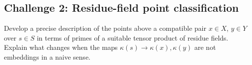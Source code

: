 \subsection*{Challenge 2: Residue-field point classification}
\begin{problem}\label{chal:vi23-02}
Develop a precise description of the points above a compatible pair $x\in X$, $y\in Y$ over $s\in S$ in terms of primes of a suitable tensor product of residue fields. Explain what changes when the maps $\kappa(s)\to\kappa(x),\kappa(y)$ are not embeddings in a naive sense.
\end{problem}
